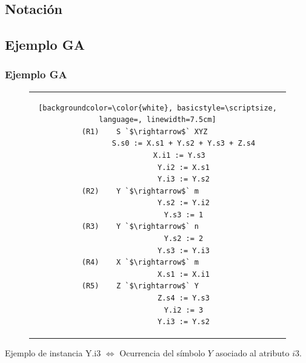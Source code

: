 \documentclass[10pt, xcolor=table, xcolor=dvipsnames]{beamer}
\begin{document}

\subsection*{Notación}


\subsection*{Ejemplo GA}

\begin{frame}[fragile]
    \frametitle{Ejemplo GA}

\begin{figure}[h]
\begin{center}
\begin{tabular}{c}
\begin{lstlisting}[backgroundcolor=\color{white}, basicstyle=\scriptsize, language=, linewidth=7.5cm]
(R1)    S `$\rightarrow$` XYZ      
            S.s0 := X.s1 + Y.s2 + Y.s3 + Z.s4
            X.i1 := Y.s3  
            Y.i2 := X.s1
            Y.i3 := Y.s2
(R2)    Y `$\rightarrow$` m        
            Y.s2 := Y.i2
            Y.s3 := 1
(R3)    Y `$\rightarrow$` n        
            Y.s2 := 2
            Y.s3 := Y.i3
(R4)    X `$\rightarrow$` m        
            X.s1 := X.i1
(R5)    Z `$\rightarrow$` Y        
            Z.s4 := Y.s3
            Y.i2 := 3
            Y.i3 := Y.s2
\end{lstlisting} 
\end{tabular}
\end{center}
\end{figure}

    \pause
    \vspace{-0.5cm}
    \begin{block}{Ejemplo de instancia}
        Y.i3 $\Leftrightarrow$ Ocurrencia del símbolo $Y$ asociado al atributo $i3$.
    \end{block}
\end{frame}
\end{document}
